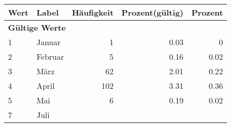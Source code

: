      \begin{longtable}{lXrrr}
     \toprule
     \textbf{Wert} & \textbf{Label} & \textbf{Häufigkeit} & \textbf{Prozent(gültig)} & \textbf{Prozent} \\
     \endhead
     \midrule
     \multicolumn{5}{l}{\textbf{Gültige Werte}}\\

     1 &
     \multicolumn{1}{X}{ Januar   } &


       \num{1} &
       \num[round-mode=places,round-precision=2]{0.03} &
         \num[round-mode=places,round-precision=2]{0} \\

     2 &
     \multicolumn{1}{X}{ Februar   } &


       \num{5} &
       \num[round-mode=places,round-precision=2]{0.16} &
         \num[round-mode=places,round-precision=2]{0.02} \\

     3 &
     \multicolumn{1}{X}{ März   } &


       \num{62} &
       \num[round-mode=places,round-precision=2]{2.01} &
         \num[round-mode=places,round-precision=2]{0.22} \\

     4 &
     \multicolumn{1}{X}{ April   } &


       \num{102} &
       \num[round-mode=places,round-precision=2]{3.31} &
         \num[round-mode=places,round-precision=2]{0.36} \\

     5 &
     \multicolumn{1}{X}{ Mai   } &


       \num{6} &
       \num[round-mode=places,round-precision=2]{0.19} &
         \num[round-mode=places,round-precision=2]{0.02} \\

     7 &
     \multicolumn{1}{X}{ Juli   } &



\end{longtable}
